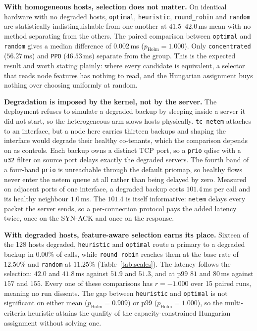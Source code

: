 \textbf{With homogeneous hosts, selection does not matter.}
On identical hardware with no degraded hosts, \texttt{optimal},
\texttt{heuristic}, \texttt{round\_robin} and \texttt{random} are statistically
indistinguishable from one another at $41.5$--$42.0$\,ms mean
with no method separating from the others. The paired comparison between
\texttt{optimal} and \texttt{random} gives a median difference of $0.002$\,ms
($p_{\text{Holm}}=1.000$). Only \texttt{concentrated} ($56.27$\,ms) and
\texttt{PPO} ($46.53$\,ms) separate from the group. This is the expected result
and worth stating plainly: where every candidate is equivalent, a selector that
reads node features has nothing to read, and the Hungarian assignment buys
nothing over choosing uniformly at random.

\textbf{Degradation is imposed by the kernel, not by the server.}
The deployment refuses to simulate a degraded backup by sleeping inside a
server it did not start, so the heterogeneous arm slows hosts physically.
\texttt{tc netem} attaches to an interface, but a node here carries thirteen
backups and shaping the interface would degrade their healthy co-tenants, which
the comparison depends on as controls. Each backup owns a distinct TCP port, so
a \texttt{prio} qdisc with a \texttt{u32} filter on source port delays exactly
the degraded servers. The fourth band of a four-band \texttt{prio} is
unreachable through the default priomap, so healthy flows never enter the netem
queue at all rather than being delayed by zero. Measured on adjacent ports of
one interface, a degraded backup costs $101.4$\,ms per call and its healthy
neighbour $1.0$\,ms. The $101.4$ is itself informative: \texttt{netem} delays
every packet the server sends, so a per-connection protocol pays the added
latency twice, once on the SYN-ACK and once on the response.

\textbf{With degraded hosts, feature-aware selection earns its place.}
Sixteen of the 128 hosts degraded, \texttt{heuristic} and \texttt{optimal}
route a primary to a degraded backup in $0.00\%$ of calls, while
\texttt{round\_robin} reaches them at the base rate of $12.50\%$ and
\texttt{random} at $11.25\%$ (Table~\ref{tab:scales}). The latency
follows the selection: $42.0$ and $41.8$\,ms against $51.9$ and $51.3$, and at
p99 $81$ and $80$\,ms against $157$ and $155$. Every one of these comparisons
has $r=-1.000$ over 15 paired runs, meaning no run dissents. The gap between
\texttt{heuristic} and \texttt{optimal} is not significant on either mean
($p_{\text{Holm}}=0.909$) or p99 ($p_{\text{Holm}}=1.000$), so the
multi-criteria heuristic attains the quality of the capacity-constrained
Hungarian assignment without solving one.

